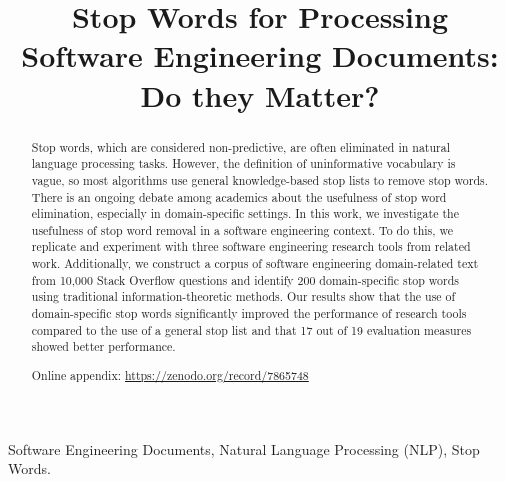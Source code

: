 \documentclass[conference]{IEEEtran}
\begin{document}
\begin{sloppy}

\title{Stop Words for Processing Software Engineering Documents: Do they Matter?}

\author{
\and
{}
\and
{}
}

\maketitle

\begin{abstract}
Stop words, which are considered non-predictive, are often eliminated in natural language processing tasks. However, the definition of uninformative vocabulary is vague, so most algorithms use general knowledge-based stop lists to remove stop words. There is an ongoing debate among academics about the usefulness of stop word elimination, especially in domain-specific settings. In this work, we investigate the usefulness of stop word removal in a software engineering context. To do this, we replicate and experiment with three software engineering research tools from related work. Additionally, we construct a corpus of software engineering domain-related text from 10,000 Stack Overflow questions and identify 200 domain-specific stop words using traditional information-theoretic methods. Our results show that the use of domain-specific stop words significantly improved the performance of research tools compared to the use of a general stop list and that 17 out of 19 evaluation measures showed better performance.

Online appendix: \url{https://zenodo.org/record/7865748}
\end{abstract}

\begin{IEEEkeywords}
Software Engineering Documents, Natural Language Processing (NLP), Stop Words.
\end{IEEEkeywords}


\end{sloppy}
\end{document}
